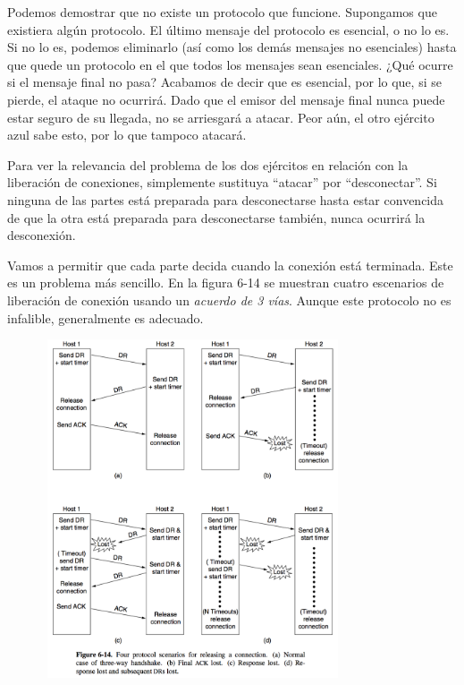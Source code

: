 \documentclass[10pt,a4paper]{report}
\begin{document}
	\par Podemos demostrar que no existe un protocolo que funcione. Supongamos que existiera algún protocolo. El último mensaje del protocolo es esencial, o no lo es. Si no lo es, podemos eliminarlo (así como los demás mensajes no esenciales) hasta que quede un protocolo en el que todos los mensajes sean esenciales. ¿Qué ocurre si el mensaje final no pasa? Acabamos de decir que es esencial, por lo que, si se pierde, el ataque no ocurrirá. Dado que el emisor del mensaje final nunca puede estar seguro de su llegada, no se arriesgará a atacar. Peor aún, el otro ejército azul sabe esto, por lo que tampoco atacará.

	\par Para ver la relevancia del problema de los dos ejércitos en relación con la liberación de conexiones, simplemente sustituya “atacar” por “desconectar”. Si ninguna de las partes está preparada para desconectarse hasta estar convencida de que la otra está preparada para desconectarse también, nunca ocurrirá la desconexión.
	
	\par Vamos a permitir que cada parte decida cuando la conexión está terminada. Este es un problema más sencillo. En la figura 6-14 se muestran cuatro escenarios de liberación de conexión usando un \textit{acuerdo de 3 vías}. Aunque este protocolo no es infalible, generalmente es adecuado.
	
	\begin{center}
		\includegraphics[width=11cm, height=10cm]{./imagenes/conexion.png}
	\end{center}
\end{document}
